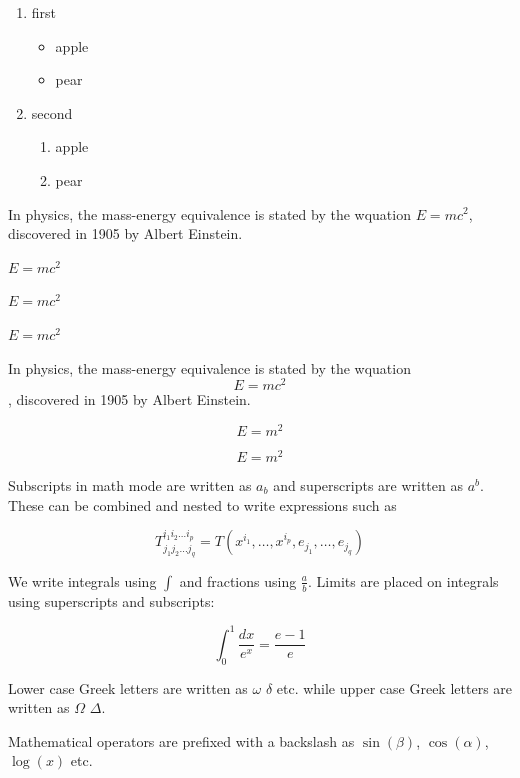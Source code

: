 \documentclass[12pt, a4paper]{article}
\begin{document}
\begin{enumerate}
    \item first
          \begin{itemize}
              \item apple
              \item pear
          \end{itemize}
    \item second
          \begin{enumerate}
              \item apple
              \item pear
          \end{enumerate}
\end{enumerate}


In physics, the mass-energy equivalence is stated
by the wquation $E=mc^2$, discovered in 1905 by Albert Einstein.

\(E=mc^2\)

$E=mc^2$

\begin{math}
    E=mc^2
\end{math}

In physics, the mass-energy equivalence is stated
by the wquation \[E=mc^2\], discovered in 1905 by Albert Einstein.

\begin{equation}
    E=m^2 %
\end{equation}

\begin{equation*}
    E=m^2 %
\end{equation*}

Subscripts in math mode are written as $a_b$ and superscripts are written as $a^b$. These can be combined and nested to write expressions such as

\[ T^{i_1 i_2 \dots i_p}_{j_1 j_2 \dots j_q} = T(x^{i_1},\dots,x^{i_p},e_{j_1},\dots,e_{j_q}) \]

We write integrals using $\int$ and fractions using $\frac{a}{b}$. Limits are placed on integrals using superscripts and subscripts:

\[ \int_0^1 \frac{dx}{e^x} =  \frac{e-1}{e} \]

Lower case Greek letters are written as $\omega$ $\delta$ etc. while upper case Greek letters are written as $\Omega$ $\Delta$.

Mathematical operators are prefixed with a backslash as $\sin(\beta)$, $\cos(\alpha)$, $\log(x)$ etc.
\end{document}
